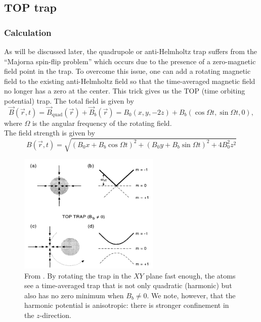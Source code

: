 \documentclass{book}
\theoremstyle{definition}
\begin{document}
\newpage

\subsection*{TOP trap}


\subsubsection*{Calculation}

As will be discussed later, the quadrupole or anti-Helmholtz trap suffers from the ``Majorna spin-flip problem'' which occurs due to the presence of a zero-magnetic field point in the trap. To overcome this issue, one can add a rotating magnetic field to the existing anti-Helmholtz field so that the time-averaged magnetic field no longer has a zero at the center. This trick gives us the TOP (time orbiting potential) trap. The total field is given by 
\begin{equation*}
\vec{B}(\vec{r},t) = \vec{B}_\text{quad}(\vec{r}) + \vec{B}_b(\vec{r}) = B_0 (x,y,-2z) + B_b(\cos\Omega t, \sin\Omega t,0),
\end{equation*} 
where $\Omega$ is the angular frequency of the rotating field. \\


The field strength is given by 
\begin{equation*}
B(\vec{r},t) = \sqrt{(B_0 x + B_b\cos\Omega t)^2 + (B_0 y + B_b\sin\Omega t)^2 + 4 B_0^2 z^2 }
\end{equation*}

\begin{figure}[!htb]
	\centering
	\includegraphics[width=0.6\textwidth]{images/TOP_trap.png}
	\caption{From \cite{PhysRevLett.74.3352}. By rotating the trap in the $XY$ plane fast enough, the atoms see a time-averaged trap that is not only quadratic (harmonic) but also has no zero minimum when $B_b \neq 0$. We note, however, that the harmonic potential is anisotropic: there is stronger confinement in the $z$-direction.}
	\label{fig:cornell}
\end{figure}
\end{document}

